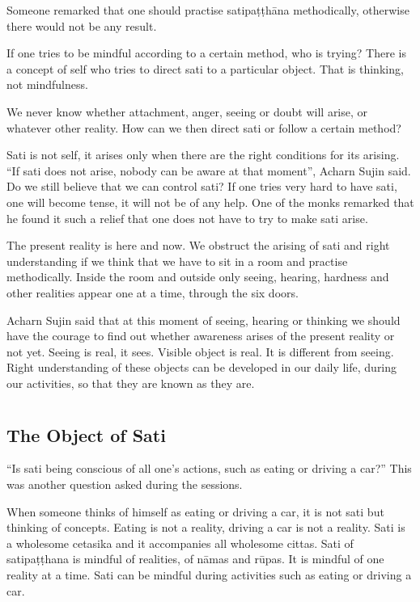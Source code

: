 Someone remarked that one should practise satipaṭṭhāna methodically,
otherwise there would not be any result.

If one tries to be mindful according to a certain method, who is trying?
There is a concept of self who tries to direct sati to a particular
object. That is thinking, not mindfulness.

We never know whether attachment, anger, seeing or doubt will arise, or
whatever other reality. How can we then direct sati or follow a certain
method?

Sati is not self, it arises only when there are the right conditions for
its arising. ``If sati does not arise, nobody can be aware at that
moment'', Acharn Sujin said. Do we still believe that we can control
sati? If one tries very hard to have sati, one will become tense, it
will not be of any help. One of the monks remarked that he found it such
a relief that one does not have to try to make sati arise.

The present reality is here and now. We obstruct the arising of sati and
right understanding if we think that we have to sit in a room and
practise methodically. Inside the room and outside only seeing, hearing,
hardness and other realities appear one at a time, through the six
doors.

Acharn Sujin said that at this moment of seeing, hearing or thinking we
should have the courage to find out whether awareness arises of the
present reality or not yet. Seeing is real, it sees. Visible object is
real. It is different from seeing. Right understanding of these objects
can be developed in our daily life, during our activities, so that they
are known as they are.



\chapter[The Object of Sati]{}
\section*{The Object of Sati}

``Is sati being conscious of all one's actions, such as eating or
driving a car?'' This was another question asked during the sessions.

When someone thinks of himself as eating or driving a car, it is not
sati but thinking of concepts. Eating is not a reality, driving a car is
not a reality. Sati is a wholesome cetasika and it accompanies all
wholesome cittas. Sati of satipaṭṭhana is mindful of realities, of nāmas
and rūpas. It is mindful of one reality at a time. Sati can be mindful
during activities such as eating or driving a car.

